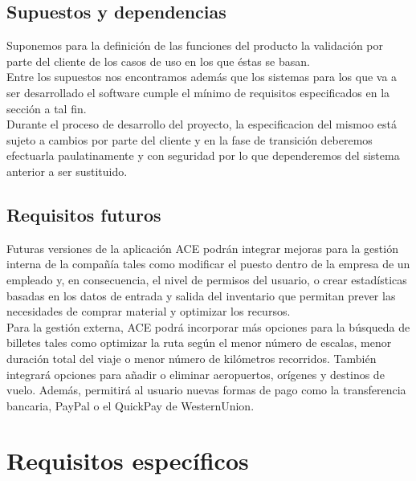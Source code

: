 \documentclass[11pt, a4paper, twoside, titlepage]{article}
\begin{document}
		\subsection{Supuestos y dependencias} %
			
			Suponemos para la definición de las funciones del producto la validación por parte del cliente de los casos de uso en los que éstas se basan.\\
			Entre los supuestos nos encontramos además que los sistemas para los que va a ser desarrollado el software cumple el mínimo de requisitos especificados en la sección a tal fin.\\
			Durante el proceso de desarrollo del proyecto, la especificacion del mismoo está sujeto a cambios por parte del cliente y en la fase de transición deberemos efectuarla paulatinamente y con seguridad por lo que dependeremos del sistema anterior a ser sustituido.
			
		\subsection{Requisitos futuros}
			Futuras versiones de la aplicación ACE podrán integrar mejoras para la gestión interna de la compañía tales como modificar el puesto dentro de la empresa de un empleado y, en consecuencia, el nivel de permisos del usuario, o crear estadísticas basadas en los datos de entrada y salida del inventario que permitan prever las necesidades de comprar material y optimizar los recursos. \\
		
			Para la gestión externa, ACE podrá incorporar más opciones para la búsqueda de billetes tales como optimizar la ruta según el menor número de escalas, menor duración total del viaje o menor número de kilómetros recorridos. También integrará opciones para añadir o eliminar aeropuertos, orígenes y destinos de vuelo. Además, permitirá al usuario nuevas formas de pago como la transferencia bancaria, \gls{PayPal} o el \gls{QuickPay} de \gls{WesternUnion}.

	\section{Requisitos específicos}
\end{document}
